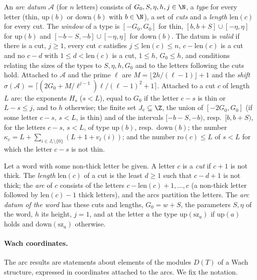 \begin{definition}[Arcs]\label{pf:linkN-adm:def-arcs}
An \emph{arc datum} $\mathcal A$ (for $n$ letters) consists of $G_0,S,\eta,h,j\in\N$, a \emph{type} for every letter (thin,
$\mathrm{up}(b)$ or $\mathrm{down}(b)$ with $b\in\N$), a set of \emph{cuts} and a \emph{length} $\mathrm{len}(c)$ for every
cut. The \emph{window} of a type is $[-G_0,G_0]$ for thin, $[b,b+S]\cup[-\eta,\eta]$ for $\mathrm{up}(b)$ and
$[-b-S,-b]\cup[-\eta,\eta]$ for $\mathrm{down}(b)$. The datum is \emph{valid} if there is a cut, $j\ge1$, every cut $c$
satisfies $j\le\mathrm{len}(c)\le n$, $c-\mathrm{len}(c)$ is a cut and no $c-d$ with $1\le d<\mathrm{len}(c)$ is a cut,
$1\le h$, $G_0\le h$, and conditions relating the sizes of the types to $S,\eta,h,G_0$ and to the letters following the
cuts hold. Attached to $\mathcal A$ and the prime $\ell$ are $M=\lfloor2h/(\ell-1)\rfloor+1$ and the \emph{shift}
$\sigma(\mathcal A)=\lceil(2G_0+M/\ell^{j-1})\ell/(\ell-1)^2+1\rceil$. Attached to a cut $c$ of length $L$ are: the exponents
$H_s$ ($s<L$), equal to $G_0$ if the letter $c-s$ is thin or $L-s\le j$, and to $h$ otherwise; the finite set $J_c\subseteq\Z$,
the union of $[-2G_0,G_0]$ (if some letter $c-s$, $s<L$, is thin) and of the intervals $[-b-S,-b)$, resp.\ $[b,b+S)$, for
the letters $c-s$, $s<L$, of type $\mathrm{up}(b)$, resp.\ $\mathrm{down}(b)$; the number
$\kappa_c=L+\sum_{i\in J_c\setminus\{0\}}(L+1+v_\ell(i))$; and the number $\mathrm{ro}(c)\le L$ of $s<L$ for which the
letter $c-s$ is not thin.

Let a word with some non-thick letter be given. A letter $c$ is a \emph{cut} if $c+1$ is not thick. The \emph{length}
$\mathrm{len}(c)$ of a cut is the least $d\ge1$ such that $c-d+1$ is not thick; the \emph{arc} of $c$ consists of the letters
$c-\mathrm{len}(c)+1,\dots,c$ (a non-thick letter followed by $\mathrm{len}(c)-1$ thick letters), and the arcs partition the
letters. The \emph{arc datum of the word} has these cuts and lengths, $G_0=w+S$, the parameters $S,\eta$ of the word, $h$ its
height, $j=1$, and at the letter $a$ the type $\mathrm{up}(\mathrm{sz}_a)$ if $\mathrm{up}(a)$ holds and
$\mathrm{down}(\mathrm{sz}_a)$ otherwise.
\end{definition}

\paragraph{Wach coordinates.}
The arc results are statements about elements of the modules $D(T)$ of a Wach structure, expressed in coordinates
attached to the arcs. We fix the notation.

